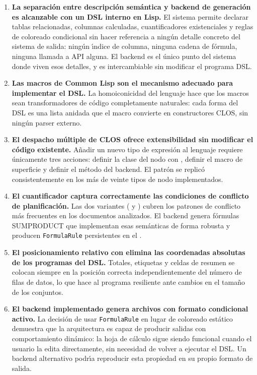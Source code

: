 \begin{enumerate}

  \item \textbf{La separaci\'on entre descripci\'on sem\'antica y backend de
    generaci\'on es alcanzable con un DSL interno en Lisp.}  El sistema
    permite declarar tablas relacionadas, columnas calculadas, cuantificadores
    existenciales y reglas de coloreado condicional sin hacer referencia a
    ning\'un detalle concreto del sistema de salida: ning\'un \'{\i}ndice de
    columna, ninguna cadena de f\'ormula, ninguna llamada a API alguna.  El
    backend es el \'unico punto del sistema donde viven esos detalles, y es
    intercambiable sin modificar el programa DSL.

  \item \textbf{Las macros de Common Lisp son el mecanismo adecuado para
    implementar el DSL.}  La homoiconicidad del lenguaje hace que los macros
    sean transformadores de c\'odigo completamente naturales: cada forma del
    DSL es una lista anidada que el macro convierte en constructores CLOS,
    sin ning\'un parser externo.

  \item \textbf{El despacho m\'ultiple de CLOS ofrece extensibilidad sin
    modificar el c\'odigo existente.}  A\~nadir un nuevo tipo de expresi\'on
    al lenguaje requiere \'unicamente tres acciones: definir la clase del nodo
    con , definir el macro de superficie y definir el m\'etodo
    del backend.  El patr\'on se replic\'o consistentemente en los m\'as de
    veinte tipos de nodo implementados.

  \item \textbf{El cuantificador  captura correctamente las
    condiciones de conflicto de planificaci\'on.}  Las dos variantes
    ( y ) cubren los patrones de conflicto
    m\'as frecuentes en los documentos analizados.  El backend genera
    f\'ormulas SUMPRODUCT que implementan esas sem\'anticas de forma robusta
    y producen \texttt{FormulaRule} persistentes en el \xlsx{}.

  \item \textbf{El posicionamiento relativo con  elimina las
    coordenadas absolutas de los programas del DSL.}  Totales, etiquetas y
    celdas de resumen se colocan siempre en la posici\'on correcta
    independientemente del n\'umero de filas de datos, lo que hace al
    programa resiliente ante cambios en el tama\~no de los conjuntos.

  \item \textbf{El backend implementado genera archivos \xlsx{} con formato
    condicional activo.}  La decisi\'on de usar \texttt{FormulaRule} en lugar
    de coloreado est\'atico demuestra que la arquitectura es capaz de producir
    salidas con comportamiento din\'amico: la hoja de c\'alculo sigue siendo
    funcional cuando el usuario la edita directamente, sin necesidad de volver
    a ejecutar el DSL.  Un backend alternativo podr\'{\i}a reproducir esta
    propiedad en su propio formato de salida.

\end{enumerate}

